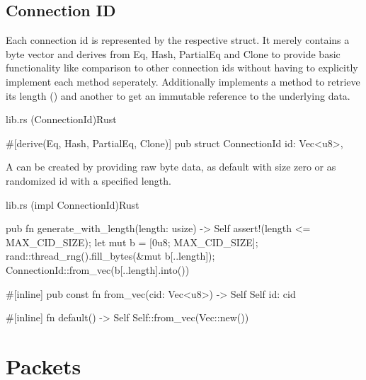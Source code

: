 \subsection{Connection ID}

Each connection id is represented by the respective  struct. It merely contains a byte vector and derives from
Eq, Hash, PartialEq and Clone to provide basic functionality like comparison to other connection ids without having to explicitly
implement each method seperately. Additionally  implements a method to retrieve its length
() and another to get an immutable reference  to the underlying data.

\begin{codeblock}{lib.rs (ConnectionId)}{Rust}
    \begin{rustcode}
        #[derive(Eq, Hash, PartialEq, Clone)]
        pub struct ConnectionId {
            id: Vec<u8>,
        }
    \end{rustcode}
    \label{connection_id}
\end{codeblock}

A  can be created by providing raw byte data, as default with size zero or as randomized id with a specified
length.

\begin{codeblock}{lib.rs (impl ConnectionId)}{Rust}
    \begin{rustcode}
        pub fn generate_with_length(length: usize) -> Self {
            assert!(length <= MAX_CID_SIZE);
            let mut b = [0u8; MAX_CID_SIZE];
            rand::thread_rng().fill_bytes(&mut b[..length]);
            ConnectionId::from_vec(b[..length].into())
        }

        #[inline]
        pub const fn from_vec(cid: Vec<u8>) -> Self {
            Self { id: cid }
        }

        #[inline]
        fn default() -> Self {
            Self::from_vec(Vec::new())
        }
    \end{rustcode}
    \label{connection_id_generation}
\end{codeblock}

\section{Packets}

